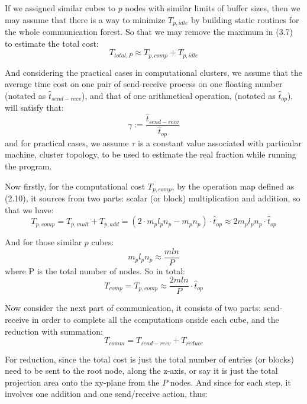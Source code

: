 \documentclass{amsart}
\theoremstyle{definition}
\theoremstyle{remark}
\numberwithin{equation}{section}
\begin{document}
	If we assigned similar cubes to $p$ nodes with similar limits of buffer sizes, then we may assume that there is a way to minimize $T_{p,idle}$ by building static routines for the whole communication forest. So that we may remove the maximum in (3.7) to estimate the total cost:
\begin{equation}
T_{total,P}\approx T_{p,comp}+T_{p,idle}
\end{equation}

	And considering the practical cases in computational clusters, we assume that the average time cost on one pair of send-receive process on one floating number (notated as $\hat{t}_{send-recv}$), and that of one arithmetical operation, (notated as $\hat{t}_{op}$), will satisfy that:
\begin{equation}
\gamma := \frac{\hat{t}_{send-recv}}{\hat{t}_{op}}
\end{equation}
and for practical cases, we assume $\tau$ is a constant value associated with particular machine, cluster topology, to be used to estimate the real fraction while running the program.\par
Now firstly, for the computational cost $T_{p,comp}$, by the operation map defined as (2.10), it sources from two parts: scalar (or block) multiplication and addition, so that we have:
\begin{equation}
T_{p,comp}=T_{p,mult}+T_{p,add}=(2\cdot m_pl_pn_p-m_pn_p)\cdot\hat{t}_{op}\approx 2m_pl_pn_p\cdot\hat{t}_{op}
\end{equation}
\par
	And for those similar $p$ cubes:
\begin{equation}
m_pl_pn_p\approx \frac{mln}{P}
\end{equation}
where P is the total number of nodes. So in total:
\begin{equation}
T_{comp}=T_{p,comp}\approx \frac{2mln}{P}\cdot\hat{t}_{op}
\end{equation}
\par
Now consider the next part of communication, it consists of two parts: send-receive in order to complete all the computations onside each cube, and the reduction with summation:
\begin{equation}
T_{comm}=T_{send-recv}+T_{reduce}
\end{equation}
\par
	For reduction, since the total cost is just the total number of entries (or blocks) need to be sent to the root node, along the z-axis, or say it is just the total projection area onto the xy-plane from the $P$ nodes. And since for each step, it involves one addition and one send/receive action, thus:
\end{document}
